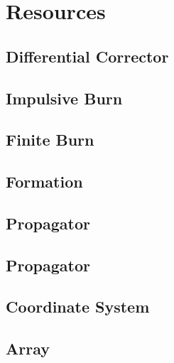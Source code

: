 
\chapter{Resources}

\section{Differential Corrector}


\section{Impulsive Burn}


\section{Finite Burn}


\section{Formation}


\section{Propagator}


\section{Propagator}


\section{Coordinate System}



\section{Array}


